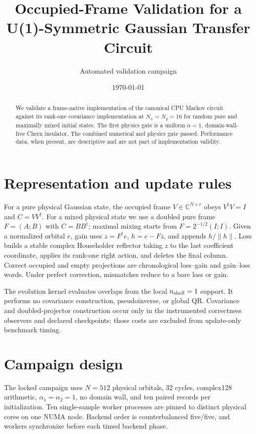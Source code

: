 \documentclass[aps,prb,onecolumn,superscriptaddress]{revtex4-2}
\begin{document}
\title{Occupied-Frame Validation for a U(1)-Symmetric Gaussian Transfer Circuit}
\author{Automated validation campaign}
\date{\today}
\begin{abstract}
We validate a frame-native implementation of the canonical CPU Markov circuit against its rank-one covariance implementation at $N_x=N_y=16$ for random pure and maximally mixed initial states. The first physics gate is a uniform $\alpha=1$, domain-wall-free Chern insulator. The combined numerical and physics gate passed. Performance data, when present, are descriptive and are not part of implementation validity.
\end{abstract}
\maketitle

\section{Representation and update rules}
For a pure physical Gaussian state, the occupied frame $V\in\mathbb C^{N\times r}$ obeys $V^\dagger V=I$ and $C=VV^\dagger$. For a mixed physical state we use a doubled pure frame $F=(A;B)$ with $C=BB^\dagger$; maximal mixing starts from $F=2^{-1/2}(I;I)$. Given a normalized orbital $e$, gain uses $z=F^\dagger e$, $h=e-Fz$, and appends $h/\lVert h\rVert$. Loss builds a stable complex Householder reflector taking $z$ to the last coefficient coordinate, applies its rank-one right action, and deletes the final column. Correct occupied and empty projections are chronological loss--gain and gain--loss words. Under perfect correction, mismatches reduce to a bare loss or gain.

The evolution kernel evaluates overlaps from the local $n_{\rm shell}=1$ support. It performs no covariance construction, pseudoinverse, or global QR. Covariance and doubled-projector construction occur only in the instrumented correctness observers and declared checkpoints; those costs are excluded from update-only benchmark timing.

\section{Campaign design}
The locked campaign uses $N=512$ physical orbitals, 32 cycles, complex128 arithmetic, $\alpha_1=\alpha_2=1$, no domain wall, and ten paired records per initialization. Ten single-sample worker processes are pinned to distinct physical cores on one NUMA node. Backend order is counterbalanced five/five, and workers synchronize before each timed backend phase.
\end{document}
